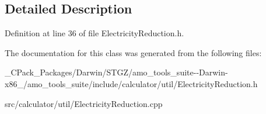 \subsection{Detailed Description}


Definition at line 36 of file Electricity\+Reduction.\+h.



The documentation for this class was generated from the following files\+:\begin{DoxyCompactItemize}
\item 
\+\_\+\+C\+Pack\+\_\+\+Packages/\+Darwin/\+S\+T\+G\+Z/amo\+\_\+tools\+\_\+suite-\/-\/\+Darwin-\/x86\+\_/amo\+\_\+tools\+\_\+suite/include/calculator/util/Electricity\+Reduction.\+h\item 
src/calculator/util/Electricity\+Reduction.\+cpp\end{DoxyCompactItemize}
